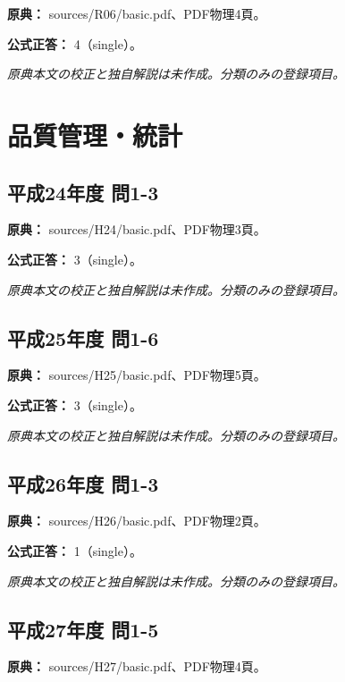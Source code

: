 \noindent\textbf{原典：} sources/R06/basic.pdf、PDF物理4頁。

\textbf{公式正答：} 4（single）。

\par\textit{原典本文の校正と独自解説は未作成。分類のみの登録項目。}

\section{品質管理・統計}

\subsection{平成24年度 問1-3}
\label{q:h24-reg-basic-1-3}

\noindent\textbf{原典：} sources/H24/basic.pdf、PDF物理3頁。

\textbf{公式正答：} 3（single）。

\par\textit{原典本文の校正と独自解説は未作成。分類のみの登録項目。}

\subsection{平成25年度 問1-6}
\label{q:h25-reg-basic-1-6}

\noindent\textbf{原典：} sources/H25/basic.pdf、PDF物理5頁。

\textbf{公式正答：} 3（single）。

\par\textit{原典本文の校正と独自解説は未作成。分類のみの登録項目。}

\subsection{平成26年度 問1-3}
\label{q:h26-reg-basic-1-3}

\noindent\textbf{原典：} sources/H26/basic.pdf、PDF物理2頁。

\textbf{公式正答：} 1（single）。

\par\textit{原典本文の校正と独自解説は未作成。分類のみの登録項目。}

\subsection{平成27年度 問1-5}
\label{q:h27-reg-basic-1-5}

\noindent\textbf{原典：} sources/H27/basic.pdf、PDF物理4頁。

